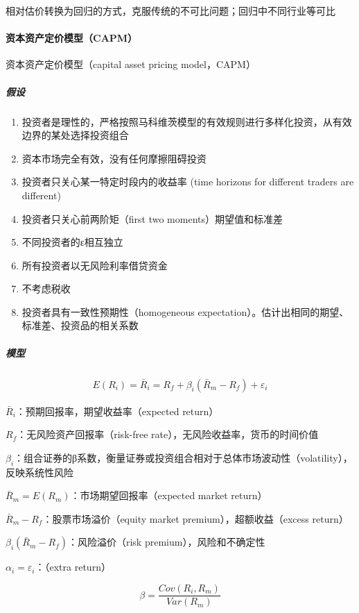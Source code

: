 \documentclass[12pt]{book}
\begin{document}
相对估价转换为回归的方式，克服传统的不可比问题；回归中不同行业等可比

\paragraph{资本资产定价模型（CAPM）}

资本资产定价模型（capital asset pricing model，CAPM）

\subparagraph{假设}	

\begin{enumerate}[(1)]
  \item 投资者是理性的，严格按照马科维茨模型的有效规则进行多样化投资，从有效边界的某处选择投资组合
  \item 资本市场完全有效，没有任何摩擦阻碍投资
  \item 投资者只关心某一特定时段内的收益率 (time horizons for different traders are different)
  \item 投资者只关心前两阶矩（first two moments）期望值和标准差
  \item 不同投资者的ε相互独立
  \item 所有投资者以无风险利率借贷资金
  \item 不考虑税收
  \item 投资者具有一致性预期性（homogeneous expectation）。估计出相同的期望、标准差、投资品的相关系数
\end{enumerate}	

\subparagraph{模型}

\begin{gather*}
  E(R_i) = \bar{R}_i = R_f+\beta_i (\bar{R}_m-R_f )+\varepsilon_i
\end{gather*}
\par $\bar{R}_i$：预期回报率，期望收益率（expected return）
\par $R_f$：无风险资产回报率（risk-free rate），无风险收益率，货币的时间价值
\par $\beta_i$：组合证券的β系数，衡量证券或投资组合相对于总体市场波动性（volatility），反映系统性风险
\par $\bar{R}_m=E(R_m )$：市场期望回报率（expected market return）
\par $\bar{R}_m-R_f$：股票市场溢价（equity market premium），超额收益（excess return）
\par $\beta_i (\bar{R}_m-R_f )$：风险溢价（risk premium），风险和不确定性
\par $\alpha_i=\varepsilon_i$：（extra return）

$$ \beta = \frac{Cov(R_i,R_m )}{Var(R_m)}  $$
\end{document}
